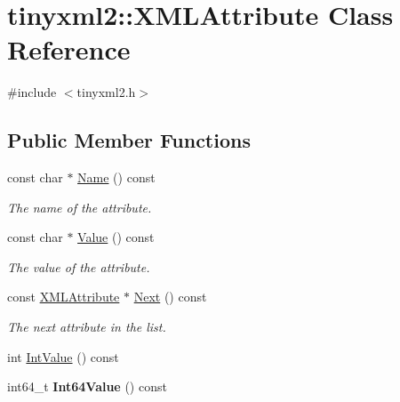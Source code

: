 \hypertarget{classtinyxml2_1_1_x_m_l_attribute}{}\section{tinyxml2\+:\+:X\+M\+L\+Attribute Class Reference}
\label{classtinyxml2_1_1_x_m_l_attribute}


{\ttfamily \#include $<$tinyxml2.\+h$>$}

\subsection*{Public Member Functions}
\begin{DoxyCompactItemize}
\item 
\hypertarget{classtinyxml2_1_1_x_m_l_attribute_a8124fbfd27f57150cc68d8a9207078c3}{}const char $\ast$ \hyperlink{classtinyxml2_1_1_x_m_l_attribute_a8124fbfd27f57150cc68d8a9207078c3}{Name} () const \label{classtinyxml2_1_1_x_m_l_attribute_a8124fbfd27f57150cc68d8a9207078c3}

\begin{DoxyCompactList}\small\item\em The name of the attribute. \end{DoxyCompactList}\item 
\hypertarget{classtinyxml2_1_1_x_m_l_attribute_aa9b08c6e592b0c88117c46666dcc1af2}{}const char $\ast$ \hyperlink{classtinyxml2_1_1_x_m_l_attribute_aa9b08c6e592b0c88117c46666dcc1af2}{Value} () const \label{classtinyxml2_1_1_x_m_l_attribute_aa9b08c6e592b0c88117c46666dcc1af2}

\begin{DoxyCompactList}\small\item\em The value of the attribute. \end{DoxyCompactList}\item 
\hypertarget{classtinyxml2_1_1_x_m_l_attribute_a7fd852d6185af90361ec1bc9a7681ad6}{}const \hyperlink{classtinyxml2_1_1_x_m_l_attribute}{X\+M\+L\+Attribute} $\ast$ \hyperlink{classtinyxml2_1_1_x_m_l_attribute_a7fd852d6185af90361ec1bc9a7681ad6}{Next} () const \label{classtinyxml2_1_1_x_m_l_attribute_a7fd852d6185af90361ec1bc9a7681ad6}

\begin{DoxyCompactList}\small\item\em The next attribute in the list. \end{DoxyCompactList}\item 
int \hyperlink{classtinyxml2_1_1_x_m_l_attribute_a949d02a5888092cc68c1e29185301863}{Int\+Value} () const 
\item 
\hypertarget{classtinyxml2_1_1_x_m_l_attribute_ad73b728250aadecaf367ac54683f8a79}{}int64\+\_\+t {\bfseries Int64\+Value} () const \label{classtinyxml2_1_1_x_m_l_attribute_ad73b728250aadecaf367ac54683f8a79}


\end{DoxyCompactItemize}
